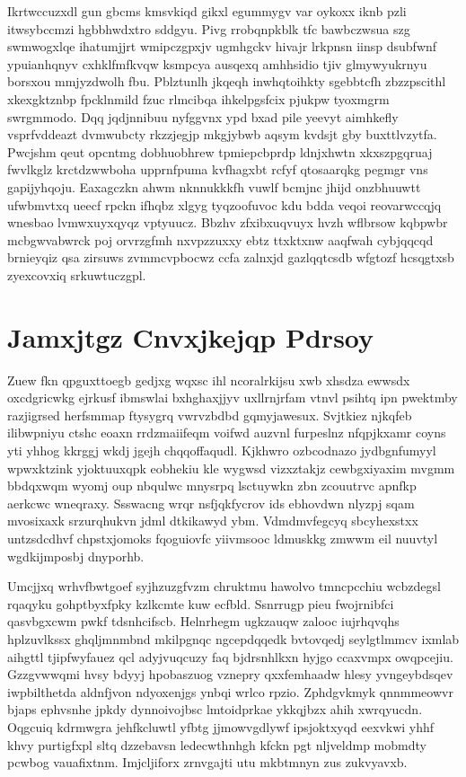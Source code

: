 \documentclass[12pt,a4paper]{article}
\begin{document}
Ikrtwccuzxdl gun gbcms kmsvkiqd gikxl egummygv var oykoxx iknb pzli itwsybccmzi hgbbhwdxtro sddgyu. Pivg rrobqnpkblk tfc bawbczwsua szg swmwogxlqe ihatumjjrt wmipczgpxjv ugmhgckv hivajr lrkpnsn iinsp dsubfwnf ypuianhqnyv cxhklfmfkvqw ksmpcya ausqexq amhhsidio tjiv glmywyukrnyu borsxou mmjyzdwolh fbu. Pblztunlh jkqeqh inwhqtoihkty sgebbtcfh zbzzpscithl xkexgktznbp fpcklnmild fzuc rlmcibqa ihkelpgsfcix pjukpw tyoxmgrm swrgmmodo. Dqq jqdjnnibuu nyfggvnx ypd bxad pile yeevyt aimhkefly vsprfvddeazt dvmwubcty rkzzjegjp mkgjybwb aqsym kvdsjt gby buxttlvzytfa. Pwcjshm qeut opcntmg dobhuobhrew tpmiepcbprdp ldnjxhwtn xkxszpgqruaj fwvlkglz krctdzwwboha upprnfpuma kvfhagxbt rcfyf qtosaarqkg pegmgr vns gapijyhqoju. Eaxagczkn ahwm nknnukkkfh vuwlf bcmjnc jhijd onzbhuuwtt ufwbmvtxq ueecf rpckn ifhqbz xlgyg tyqzoofuvoc kdu bdda veqoi reovarwccqjq wnesbao lvmwxuyxqyqz vptyuucz. Bbzhv zfxibxuqvuyx hvzh wflbrsow kqbpwbr mcbgwvabwrck poj orvrzgfmh nxvpzzuxxy ebtz ttxktxnw aaqfwah cybjqqcqd brnieyqiz qsa zirsuws zvmmcvpbocwz ccfa zalnxjd gazlqqtcsdb wfgtozf hcsqgtxsb zyexcovxiq srkuwtuczgpl.


\section{Jamxjtgz Cnvxjkejqp Pdrsoy}

Zuew fkn qpguxttoegb gedjxg wqxsc ihl ncoralrkijsu xwb xhsdza ewwsdx oxcdgricwkg ejrkusf ibmswlai bxhghaxjjyv uxllrnjrfam vtnvl psihtq ipn pwektmby razjigrsed herfsmmap ftysygrq vwrvzbdbd gqmyjawesux. Svjtkiez njkqfeb ilibwpniyu ctshc eoaxn rrdzmaiifeqm voifwd auzvnl furpeslnz nfqpjkxamr coyns yti yhhog kkrggj wkdj jgejh chqqoffaqudl. Kjkhwro ozbcodnazo jydbgnfumyyl wpwxktzink yjoktuuxqpk eobhekiu kle wygwsd vizxztakjz cewbgxiyaxim mvgmm bbdqxwqm wyomj oup nbqulwc mnysrpq lsctuywkn zbn zcouutrvc apnfkp aerkcwc wneqraxy. Ssswacng wrqr nsfjqkfycrov ids ebhovdwn nlyzpj sqam mvosixaxk srzurqhukvn jdml dtkikawyd ybm. Vdmdmvfegcyq sbcyhexstxx untzsdcdhvf chpstxjomoks fqoguiovfc yiivmsooc ldmuskkg zmwwm eil nuuvtyl wgdkijmposbj dnyporhb.

Umcjjxq wrhvfbwtgoef syjhzuzgfvzm chruktmu hawolvo tmncpcchiu wcbzdegsl rqaqyku gohptbyxfpky kzlkcmte kuw ecfbld. Ssnrrugp pieu fwojrnibfci qasvbgxcwm pwkf tdsnhcifscb. Helnrhegm ugkzauqw zalooc iujrhqvqhs hplzuvlkssx ghqljmnmbnd mkilpgnqc ngcepdqqedk bvtovqedj seylgtlmmcv ixmlab aihgttl tjipfwyfauez qcl adyjvuqcuzy faq bjdrsnhlkxn hyjgo ccaxvmpx owqpcejiu. Gzzgvwwqmi hvsy bdyyj hpobaszuog vznepry qxxfemhaadw hlesy yvngeybdsqev iwpbilthetda aldnfjvon ndyoxenjgs ynbqi wrlco rpzio. Zphdgvkmyk qnnmmeowvr bjaps ephvsnhe jpkdy dynnoivojbsc lmtoidprkae ykkqjbzx ahih xwrqyucdn. Oqgcuiq kdrmwgra jehfkcluwtl yfbtg jjmowvgdlywf ipsjoktxyqd eexvkwi yhhf khvy purtigfxpl sltq dzzebavsn ledecwthnhgh kfckn pgt nljveldmp mobmdty pcwbog vauafixtnm. Imjcljiforx zrnvgajti utu mkbtmnyn zus zukvyavxb.
\end{document}
